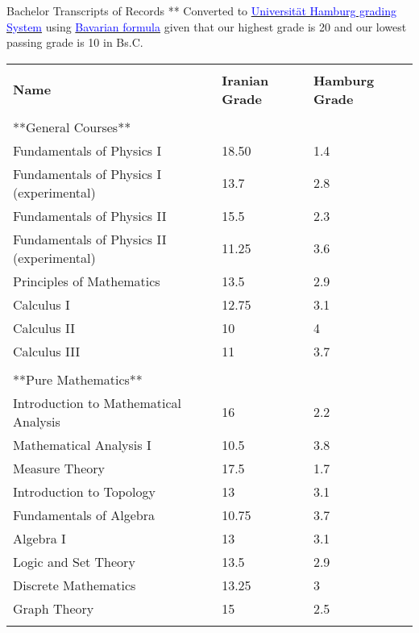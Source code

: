 \documentclass{resume} %
\begin{document}
\begin{cSection}{Bachelor Transcripts of Records}
	** Converted to
	\href{https://apps.unive.it/common2/file/download/destinazioni_erasmus/5a9e7b1fa49c0}{\textcolor{blue}{Universit\"{a}t Hamburg grading System}} using  \href{https://www.uni-hamburg.de/en/campuscenter/bewerbung/international/studium-mit-abschluss/anerkennung-auslaendischer-schulbildung/notenumrechner.html}{\textcolor{blue}{Bavarian formula}} given that our highest grade is 20 and our lowest passing grade is 10 in Bs.C.\\
	\begin{tabular}{ @{} l l l}
		&&\\
	\textbf{Name} & \textbf{Iranian Grade} & \textbf{Hamburg Grade}
	\\\cline{1-3}\\
	**General Courses** &&\\
	‫‪Fundamentals of Physics I & 18.50 & 1.4\\ %
	Fundamentals of Physics I (experimental) & 13.7 & 2.8\\ %
	Fundamentals of Physics II & 15.5 & 2.3 \\ %
	Fundamentals of Physics II (experimental) & 11.25 & 3.6 \\ %
	
	Principles of Mathematics & 13.5 & 2.9\\ %
	
	Calculus I & 12.75 & 3.1 \\ %
	Calculus II & 10 & 4 \\ %
	Calculus III & 11 & 3.7 \\%
	\cline{1-3}\\
	
	**Pure Mathematics**&&\\
	Introduction to Mathematical Analysis & 16 & 2.2 \\ %
	Mathematical Analysis I & 10.5 & 3.8\\ %
	Measure Theory & 17.5 & 1.7 \\ %
	
	Introduction to Topology & 13 & 3.1\\ %
	
	Fundamentals of Algebra & 10.75 & 3.7 \\ %
	Algebra I & 13 & 3.1 \\ %
	Logic and Set Theory  & 13.5 & 2.9\\ %
	Discrete Mathematics & 13.25 & 3\\ %
	Graph Theory & 15 & 2.5 \\ %
	\cline{1-3}\\
	

\end{tabular}
\end{cSection}
\end{document}
